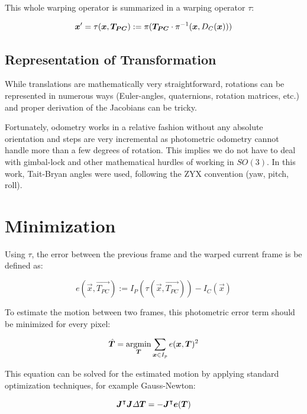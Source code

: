 This whole warping operator is summarized in a warping operator $\tau$:

\begin{equation}
    \vec{x'} = \tau(\vec{x}, \vec{T_{PC}}) := \pi( \mat{T_{PC}} \cdot \pi^{-1} (\vec{x}, D_C(\vec{x})))
\end{equation}


\subsection{Representation of Transformation}

While translations are mathematically very straightforward, rotations can be
represented in numerous ways (Euler-angles, quaternions, rotation matrices,
etc.) and proper derivation of the Jacobians can be tricky.

Fortunately, odometry works in a relative fashion without any absolute
orientation and steps are very incremental as photometric odometry cannot
handle more than a few degrees of rotation. This implies we do not have to deal
with gimbal-lock and other mathematical hurdles of working in $SO(3)$. In this
work, Tait-Bryan angles were used, following the ZYX convention (yaw, pitch,
roll).




\section{Minimization}

Using $\tau$, the error between the previous frame and the warped current frame is be defined as:

\begin{equation}
    \label{eq:error}
    e(\vec{x}, \vec{T_{PC}}) := I_P(\tau(\vec{x}, \vec{T_{PC}})) - I_C(\vec{x})
\end{equation}


To estimate the motion between two frames, this photometric error term should
be minimized for every pixel:

\begin{equation}
    \vec{\hat{T}} = \operatornamewithlimits{argmin}_{\vec{T}} \sum_{\vec{x} \in I_p} e(\vec{x}, \vec{T})^2
\end{equation}


This equation can be solved for the estimated motion by applying standard
optimization techniques, for example Gauss-Newton:

\begin{equation}
    \mat{J}^\intercal \mat{J} \Delta \vec{T} = - \mat{J}^\intercal \vec{e(\vec{T})}
\end{equation}

